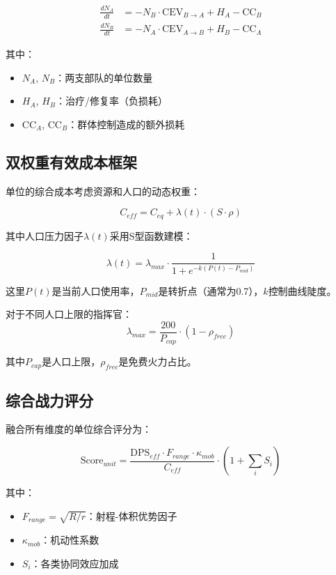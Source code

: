 \documentclass[a4paper,12pt]{article}
\begin{document}
\begin{CJK}{UTF8}{gbsn}
\begin{align}
\frac{dN_A}{dt} &= -N_B \cdot \text{CEV}_{B \rightarrow A} + H_A - \text{CC}_B \\
\frac{dN_B}{dt} &= -N_A \cdot \text{CEV}_{A \rightarrow B} + H_B - \text{CC}_A
\end{align}

其中：
\begin{itemize}
\item $N_A$, $N_B$：两支部队的单位数量
\item $H_A$, $H_B$：治疗/修复率（负损耗）
\item $\text{CC}_A$, $\text{CC}_B$：群体控制造成的额外损耗
\end{itemize}

\subsection{双权重有效成本框架}
单位的综合成本考虑资源和人口的动态权重：

\begin{equation}
C_{eff} = C_{eq} + \lambda(t) \cdot (S \cdot \rho)
\end{equation}

其中人口压力因子$\lambda(t)$采用S型函数建模：

\begin{equation}
\lambda(t) = \lambda_{max} \cdot \frac{1}{1 + e^{-k(P(t) - P_{mid})}}
\end{equation}

这里$P(t)$是当前人口使用率，$P_{mid}$是转折点（通常为0.7），$k$控制曲线陡度。

对于不同人口上限的指挥官：
\begin{equation}
\lambda_{max} = \frac{200}{P_{cap}} \cdot (1 - \rho_{free})
\end{equation}

其中$P_{cap}$是人口上限，$\rho_{free}$是免费火力占比。

\subsection{综合战力评分}
融合所有维度的单位综合评分为：

\begin{equation}
\text{Score}_{unit} = \frac{\text{DPS}_{eff} \cdot F_{range} \cdot \kappa_{mob}}{C_{eff}} \cdot (1 + \sum_{i} S_i)
\end{equation}

其中：
\begin{itemize}
\item $F_{range} = \sqrt{R/r}$：射程-体积优势因子
\item $\kappa_{mob}$：机动性系数
\item $S_i$：各类协同效应加成
\end{itemize}


\end{CJK}
\end{document}
